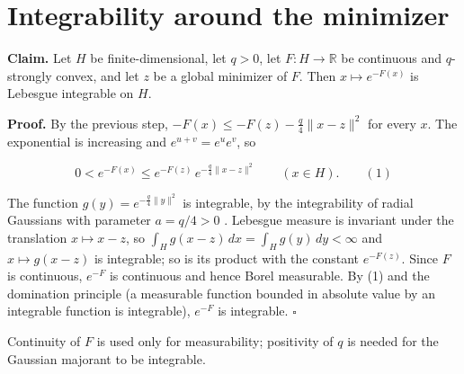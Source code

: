 \documentclass[11pt,a4paper]{article}
\begin{document}
\section{\texorpdfstring{Integrability around the minimizer}{Integrability around the minimizer}}


\textbf{Claim.} Let \(H\) be finite-dimensional, let \(q>0\), let \(F:H\to\mathbb R\) be continuous and \(q\)-strongly convex, and let \(z\) be a global minimizer of \(F\). Then \(x\mapsto e^{-F(x)}\) is Lebesgue integrable on \(H\).




\textbf{Proof.} By the previous step, \(-F(x)\le-F(z)-\frac q4\|x-z\|^2\) for every \(x\). The exponential is increasing and \(e^{u+v}=e^ue^v\), so


\[0<e^{-F(x)}\le e^{-F(z)}\,e^{-\frac q4\|x-z\|^2}\qquad(x\in H).\qquad(1)\]


The function \(g(y)=e^{-\frac q4\|y\|^2}\) is integrable, by the integrability of radial Gaussians with parameter \(a=q/4>0\) \cite[Section~3.26.4]{LangevinLean2026ULASC}. Lebesgue measure is invariant under the translation \(x\mapsto x-z\), so \(\int_H g(x-z)\,dx=\int_Hg(y)\,dy<\infty\) and \(x\mapsto g(x-z)\) is integrable; so is its product with the constant \(e^{-F(z)}\). Since \(F\) is continuous, \(e^{-F}\) is continuous and hence Borel measurable. By (1) and the domination principle (a measurable function bounded in absolute value by an integrable function is integrable), \(e^{-F}\) is integrable. \(\square\)




Continuity of \(F\) is used only for measurability; positivity of \(q\) is needed for the Gaussian majorant to be integrable.
\end{document}
